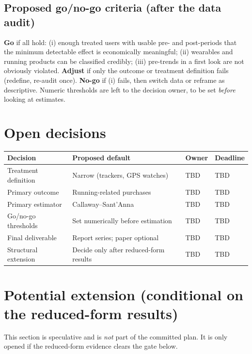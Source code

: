 \documentclass[11pt]{article}
\begin{document}
\subsection*{Proposed go/no-go criteria (after the data audit)}
\textbf{Go} if all hold: (i) enough treated users with usable pre- and post-periods that the minimum detectable effect is
economically meaningful; (ii) wearables and running products can be classified credibly; (iii) pre-trends in a first
look are not obviously violated. \textbf{Adjust} if only the outcome or treatment definition fails (redefine, re-audit once).
\textbf{No-go} if (i) fails, then switch data or reframe as descriptive. Numeric thresholds are left to the
decision owner, to be set \emph{before} looking at estimates.

\section{Open decisions}
\begin{tabular}{p{}p{}p{}p{}}
\toprule
Decision & Proposed default & Owner & Deadline \\
\midrule
Treatment definition & Narrow (trackers, GPS watches) & TBD & TBD \\
Primary outcome & Running-related purchases & TBD & TBD \\
Primary estimator & Callaway--Sant'Anna & TBD & TBD \\
Go/no-go thresholds & Set numerically before estimation & TBD & TBD \\
Final deliverable & Report series; paper optional & TBD & TBD \\
Structural extension & Decide only after reduced-form results & TBD & TBD \\
\bottomrule
\end{tabular}

\section{Potential extension (conditional on the reduced-form results)}
This section is speculative and is \emph{not} part of the committed plan. It is only opened if the reduced-form
evidence clears the gate below.
\end{document}
